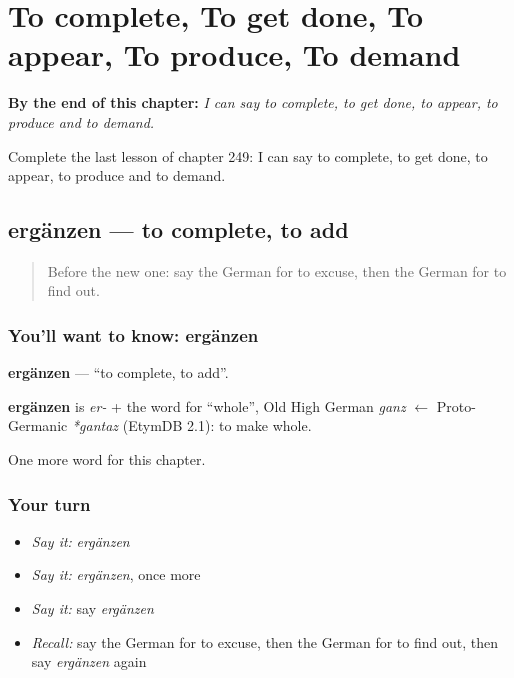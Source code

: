 
\chapter{To complete, To get done, To appear, To produce, To demand}
\label{ch:ge-to-complete-to-get-done-to-appear-to-produce-to-demand}

\begin{chapteropening}
\textbf{By the end of this chapter:} \emph{I can say to complete, to get done, to appear, to produce and to demand.}

Complete the last lesson of chapter 249: I can say to complete, to get done, to appear, to produce and to demand.
\end{chapteropening}

\section[ergänzen]{ergänzen — to complete, to add}

\label{lesson:GE-C249-ergaenzen}



\begin{quote}
Before the new one: say the German for to excuse, then the German for to find out.
\end{quote}

\subsection*{You'll want to know: ergänzen}
\textbf{ergänzen} — \textquotedblleft{}to complete, to add\textquotedblright{}.

\begin{cousinweb}
\textbf{ergänzen} is \emph{er-} + the word for \textquotedblleft{}whole\textquotedblright{}, Old High German \emph{ganz} $\leftarrow$ Proto-Germanic \emph{*gantaz} (EtymDB 2.1): to make whole.
\end{cousinweb}

\begin{grammarlens}[title={What you've built}]
One more word for this chapter.
\end{grammarlens}

\subsection*{Your turn}
\begin{itemize}
\raggedright
  \item \emph{Say it:} \emph{ergänzen}
  \item \emph{Say it:} \emph{ergänzen}, once more
  \item \emph{Say it:} say \emph{ergänzen}
  \item \emph{Recall:} say the German for to excuse, then the German for to find out, then say \emph{ergänzen} again
\end{itemize}


